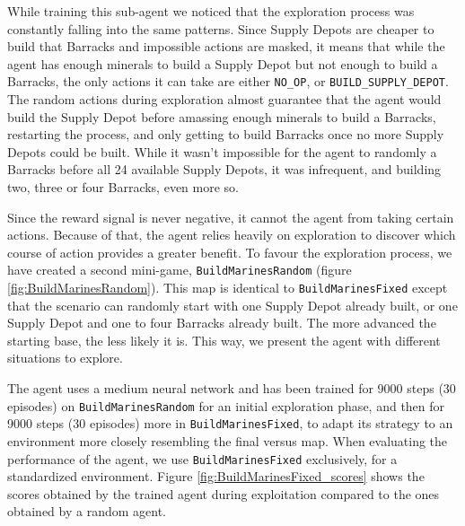 While training this sub-agent we noticed that the exploration process was constantly falling into the same patterns. Since Supply Depots are cheaper to build that Barracks and impossible actions are masked, it means that while the agent has enough minerals to build a Supply Depot but not enough to build a Barracks, the only actions it can take are either \texttt{NO\_OP}, or \texttt{BUILD\_SUPPLY\_DEPOT}. The random actions during exploration almost guarantee that the agent would build the Supply Depot before amassing enough minerals to build a Barracks, restarting the process, and only getting to build Barracks once no more Supply Depots could be built. While it wasn't impossible for the agent to randomly a Barracks before all 24 available Supply Depots, it was infrequent, and building two, three or four Barracks, even more so.

Since the reward signal is never negative, it cannot  the agent from taking certain actions. Because of that, the agent relies heavily on exploration to discover which course of action provides a greater benefit. To favour the exploration process, we have created a second mini-game, \texttt{BuildMarinesRandom} (figure \ref{fig:BuildMarinesRandom}). This map is identical to \texttt{BuildMarinesFixed} except that the scenario can randomly start with one Supply Depot already built, or one Supply Depot and one to four Barracks already built. The more advanced the starting base, the less likely it is. This way, we present the agent with different situations to explore.

The agent uses a medium neural network and has been trained for 9000 steps (30 episodes) on \texttt{BuildMarinesRandom} for an initial exploration phase, and then for 9000 steps (30 episodes) more in \texttt{BuildMarinesFixed}, to adapt its strategy to an environment more closely resembling the final versus map. When evaluating the performance of the agent, we use \texttt{BuildMarinesFixed} exclusively, for a standardized environment. Figure \ref{fig:BuildMarinesFixed_scores} shows the scores obtained by the trained agent during exploitation compared to the ones obtained by a random agent.

